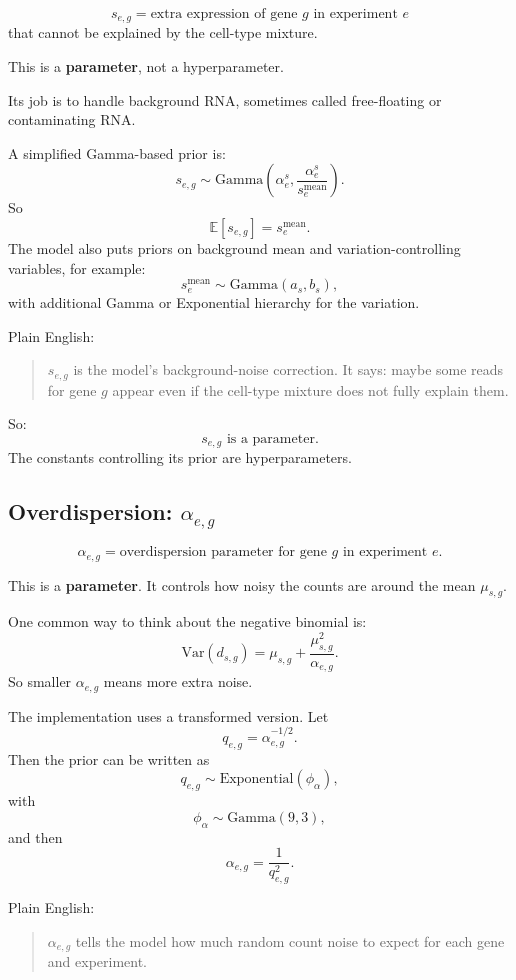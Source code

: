 \documentclass[11pt]{article}
\newcommand{\E}{\mathbb{E}}
\newcommand{\Var}{\mathrm{Var}}
\newcommand{\term}[1]{\textbf{#1}}
\begin{document}
\[
s_{e,g}=\text{extra expression of gene }g\text{ in experiment }e
\]
that cannot be explained by the cell-type mixture.

This is a \term{parameter}, not a hyperparameter.

Its job is to handle background RNA, sometimes called free-floating or contaminating RNA.

A simplified Gamma-based prior is:
\[
s_{e,g}\sim \mathrm{Gamma}\left(\alpha^s_e,\frac{\alpha^s_e}{s^{\mathrm{mean}}_e}\right).
\]
So
\[
\E[s_{e,g}]=s^{\mathrm{mean}}_e.
\]
The model also puts priors on background mean and variation-controlling variables, for example:
\[
s^{\mathrm{mean}}_e\sim \mathrm{Gamma}(a_s,b_s),
\]
with additional Gamma or Exponential hierarchy for the variation.

Plain English:

\begin{quote}
$s_{e,g}$ is the model's background-noise correction. It says: maybe some reads for gene $g$ appear even if the cell-type mixture does not fully explain them.
\end{quote}

So:
\[
s_{e,g}\text{ is a parameter.}
\]
The constants controlling its prior are hyperparameters.

\subsection{Overdispersion: $\alpha_{e,g}$}

\[
\alpha_{e,g}=\text{overdispersion parameter for gene }g\text{ in experiment }e.
\]

This is a \term{parameter}. It controls how noisy the counts are around the mean $\mu_{s,g}$.

One common way to think about the negative binomial is:
\[
\Var(d_{s,g})=\mu_{s,g}+\frac{\mu_{s,g}^2}{\alpha_{e,g}}.
\]
So smaller $\alpha_{e,g}$ means more extra noise.

The implementation uses a transformed version. Let
\[
q_{e,g}=\alpha_{e,g}^{-1/2}.
\]
Then the prior can be written as
\[
q_{e,g}\sim \mathrm{Exponential}(\phi_\alpha),
\]
with
\[
\phi_\alpha\sim \mathrm{Gamma}(9,3),
\]
and then
\[
\alpha_{e,g}=\frac{1}{q_{e,g}^2}.
\]

Plain English:

\begin{quote}
$\alpha_{e,g}$ tells the model how much random count noise to expect for each gene and experiment.
\end{quote}
\end{document}

